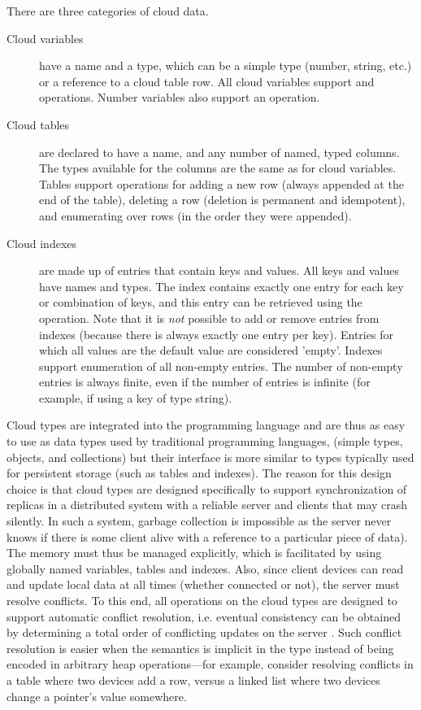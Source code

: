 \documentclass[article]{sigplanconf}
\begin{document}
There are three categories of cloud data.
\begin{description}
\item[Cloud variables] have a name and a type, which can be a simple type (number, string, etc.) or a reference to a cloud table row. All cloud variables support  and  operations. Number variables also support an  operation.
\item[Cloud tables]  are declared to have a name, and any number of named, typed columns.  The types available for the columns  are the same as for cloud variables. Tables support operations for adding a new row (always appended at the end of the table), deleting a row (deletion is permanent and idempotent), and enumerating over rows (in the order they were appended). 
\item[Cloud indexes] are made up of entries that contain keys and values. All keys and values have names and types. The index contains exactly one entry for each key or combination of keys, and this entry can be retrieved using the  operation. Note that it is \emph{not} possible to add or remove entries from indexes (because there is always exactly one entry per key). Entries for which all values are the default value are considered 'empty'. Indexes support enumeration of all non-empty entries. The number of non-empty entries is always finite, even if the number of entries is infinite (for example, if using a key of type string).
\end{description}

Cloud types are integrated into the programming language and are thus as easy to
use as data types used by traditional programming languages, (simple types,
objects, and collections) but their interface is more similar to types
typically used for persistent storage (such as tables and
indexes).
The reason for this design choice is that cloud types are designed specifically to
support synchronization of replicas in a distributed system with a reliable
server and clients that may crash silently. 
In such a system, garbage collection is impossible as the server never knows if
there is some client alive with a reference to a particular piece of data).
The memory must thus be managed explicitly, which is
facilitated by using globally named variables, tables and indexes. 
Also, since client devices can read and update local data at all times (whether
connected or not), the server must resolve conflicts.
To this end, all operations on the
cloud types are designed to support automatic conflict resolution, i.e.
eventual consistency can be obtained by determining a total order of
conflicting updates on the server
\cite{burckhardt2012cloud,terry-et-al-SIGOPS95}. 
Such conflict resolution is easier when the semantics is implicit in the type
instead of being encoded in arbitrary heap operations---for example, consider
resolving conflicts in a table where two devices add a row, versus a linked list
where two devices change a pointer's value somewhere.
\end{document}
